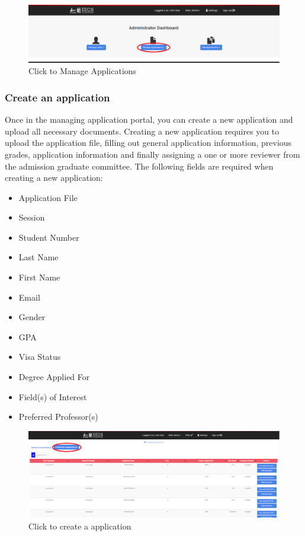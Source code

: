 \documentclass[fontsize=12pt,paper=letter,twoside]{scrartcl}
\begin{document}
\begin{figure}[!htb]
\begin{center}
\includegraphics[width=.99\textwidth]{images/adm/ma/manage_app.png}
\end{center}
\caption{Click to Manage Applications}
\label{fig:adm/manage_app}
\end{figure}

\subsubsection{Create an application} \label{c_appl}
Once in the managing application portal, you can create a new application and upload all necessary documents. Creating a new application requires you to upload the application file, filling out general application information, previous grades, application information and finally assigning a one or more reviewer from the admission graduate committee. The following fields are required when creating a new application:
\begin{itemize}
\item Application File
\item Session
\item Student Number
\item Last Name
\item First Name
\item Email
\item Gender
\item GPA
\item Visa Status
\item Degree Applied For
\item Field(s) of Interest
\item Preferred Professor(s)
\end{itemize}

\begin{figure}[!htb]
\begin{center}
\includegraphics[width=.99\textwidth]{images/adm/ma/new_app_click.png}
\end{center}
\caption{Click to create a application}
\label{fig:adm/new_app_click}
\end{figure}
\end{document}

